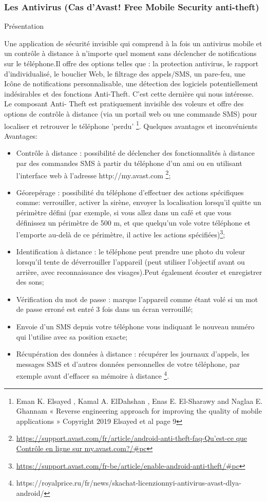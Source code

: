 \documentclass[a4paper, 12pt]{article}
\begin{document}
\subsubsection{Les Antivirus (Cas d’Avast! Free Mobile Security anti-theft)}
Présentation

\quad Une application de sécurité invisible qui comprend à la fois un antivirus mobile et un contrôle à distance à n'importe quel moment sans déclencher de notifications sur le téléphone.Il offre des options telles que : la protection antivirus, le rapport d’individualisé, le bouclier Web, le filtrage des appels/SMS, un pare-feu, une Icône de notifications personnalisable, une détection des logiciels potentiellement indésirables et des fonctions Anti-Theft. C’est cette dernière qui nous intéresse. Le composant Anti- Theft est pratiquement invisible des voleurs et offre des options de contrôle à distance (via un portail web ou une commande SMS) pour localiser et retrouver le téléphone 'perdu' \footnote{Eman K. Elsayed , Kamal A. ElDahshan , Enas E. El-Sharawy and Naglaa E. Ghannam « Reverse engineering approach for improving the quality of mobile applications » Copyright 2019 Elsayed et al page 9}. Quelques avantages et inconvénients
\newline
Avantages:
\begin{itemize}
\item Contrôle à distance : possibilité de déclencher des fonctionnalités à distance par des commandes SMS à partir du téléphone d'un ami ou en utilisant l’interface web à l’adresse http://my.avast.com  \footnote{\url{https://support.avast.com/fr/article/android-anti-theft-faq-Qu’est-ce que Contrôle en ligne sur my.avast.com?/#pc}};
\item Géorepérage : possibilité du téléphone d’effectuer des actions spécifiques comme: verrouiller, activer la sirène, envoyer la localisation lorsqu'il quitte un périmètre défini (par exemple, si vous allez dans un café et que vous définissez un périmètre
de 500 m, et que quelqu'un vole votre téléphone et l'emporte au-delà de ce périmètre, il active les actions spécifiées)\footnote{\url{https://support.avast.com/fr-be/article/enable-android-anti-theft/#pc}};
\item Identification à distance : le téléphone peut prendre une photo du voleur lorsqu'il tente de déverrouiller l'appareil (peut utiliser l'objectif avant ou arrière, avec reconnaissance des visages).Peut également écouter et enregistrer des sons;
\item Vérification du mot de passe : marque l'appareil comme étant volé si un mot de passe erroné est entré 3 fois dans un écran verrouillé;
\item Envoie d’un SMS depuis votre téléphone vous indiquant le nouveau numéro qui l’utilise avec sa position exacte;
\item Récupération des données à distance : récupérer les journaux d'appels, les messages SMS et d'autres données personnelles de votre téléphone, par exemple avant d'effacer sa mémoire à distance \footnote{https://royalprice.ru/fr/news/skachat-licenzionnyi-antivirus-avast-dlya-android/}.
 \end{itemize}
\end{document}
